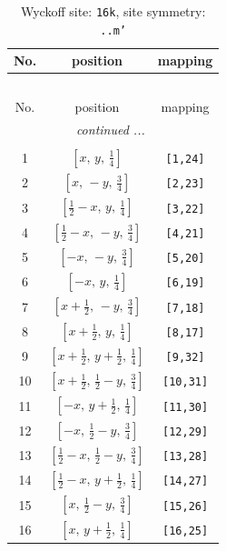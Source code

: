 \documentclass[fleqn,8pt]{jsarticle}
\begin{document}
\renewcommand{\arraystretch}{1.2}
\begin{longtable}{ccc}
\caption{Wyckoff site: {\tt 16k}, site symmetry: {\tt ..m'}}
 \\
 \hline \hline
No. & position & mapping \\ \hline \endfirsthead

\multicolumn{2}{l}{\tablename\ \thetable{}} \\
 \hline \hline
No. & position & mapping \\ \hline \endhead

 \hline \hline
\multicolumn{2}{r}{\footnotesize\it continued ...} \\ \endfoot

 \hline \hline
\multicolumn{2}{r}{} \\ \endlastfoot

1 & $\left[ x,\, y,\, \frac{1}{4} \right]$ & {\tt [1,24]} \\ \hline
2 & $\left[ x,\, - y,\, \frac{3}{4} \right]$ & {\tt [2,23]} \\ \hline
3 & $\left[ \frac{1}{2} - x,\, y,\, \frac{1}{4} \right]$ & {\tt [3,22]} \\ \hline
4 & $\left[ \frac{1}{2} - x,\, - y,\, \frac{3}{4} \right]$ & {\tt [4,21]} \\ \hline
5 & $\left[ - x,\, - y,\, \frac{3}{4} \right]$ & {\tt [5,20]} \\ \hline
6 & $\left[ - x,\, y,\, \frac{1}{4} \right]$ & {\tt [6,19]} \\ \hline
7 & $\left[ x + \frac{1}{2},\, - y,\, \frac{3}{4} \right]$ & {\tt [7,18]} \\ \hline
8 & $\left[ x + \frac{1}{2},\, y,\, \frac{1}{4} \right]$ & {\tt [8,17]} \\ \hline
9 & $\left[ x + \frac{1}{2},\, y + \frac{1}{2},\, \frac{1}{4} \right]$ & {\tt [9,32]} \\ \hline
10 & $\left[ x + \frac{1}{2},\, \frac{1}{2} - y,\, \frac{3}{4} \right]$ & {\tt [10,31]} \\ \hline
11 & $\left[ - x,\, y + \frac{1}{2},\, \frac{1}{4} \right]$ & {\tt [11,30]} \\ \hline
12 & $\left[ - x,\, \frac{1}{2} - y,\, \frac{3}{4} \right]$ & {\tt [12,29]} \\ \hline
13 & $\left[ \frac{1}{2} - x,\, \frac{1}{2} - y,\, \frac{3}{4} \right]$ & {\tt [13,28]} \\ \hline
14 & $\left[ \frac{1}{2} - x,\, y + \frac{1}{2},\, \frac{1}{4} \right]$ & {\tt [14,27]} \\ \hline
15 & $\left[ x,\, \frac{1}{2} - y,\, \frac{3}{4} \right]$ & {\tt [15,26]} \\ \hline
16 & $\left[ x,\, y + \frac{1}{2},\, \frac{1}{4} \right]$ & {\tt [16,25]} \\
\end{longtable}
\end{document}
